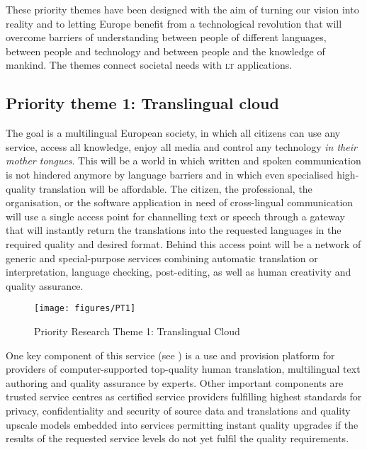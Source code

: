 \documentclass[output=paper]{LSP/langsci}
\begin{document}
These priority themes have been designed with the aim of turning our
vision into reality and to letting Europe benefit from a technological
revolution that will overcome barriers of understanding between people
of different languages, between people and technology and between
people and the knowledge of mankind. The themes connect societal needs
with \textsc{lt} applications.

\subsection{Priority theme 1: Translingual cloud}
\label{sec:priority-theme-1-translation-cloud}

The goal is a multilingual European society, in which all citizens can
use any service, access all knowledge, enjoy all media and control any
technology \emph{in their mother tongues}. This will be a world in
which written and spoken communication is not hindered anymore by
language barriers and in which even specialised high-quality
translation will be affordable. The citizen, the professional, the
organisation, or the software application in need of cross-lingual
communication will use a single access point for channelling text or
speech through a gateway that will instantly return the translations
into the requested languages in the required quality and desired
format. Behind this access point will be a network of generic and
special-purpose services combining automatic translation or
interpretation, language checking, post-editing, as well as human
creativity and quality assurance.

\begin{figure*}[htb]
  \center
  \texttt{[image: figures/PT1]}
  \caption{Priority Research Theme 1: Translingual Cloud}
  \label{fig:pt1-overview}
\end{figure*}

\newpage %
One key component of this service (see )
is a use and provision platform for providers of computer-supported
top-quality human translation, multilingual text authoring and quality
assurance by experts. Other important components are trusted service
centres as certified service providers fulfilling highest standards
for privacy, confidentiality and security of source data and
translations and quality upscale models embedded into services
permitting instant quality upgrades if the results of the requested
service levels do not yet fulfil the quality requirements.
\end{document}
